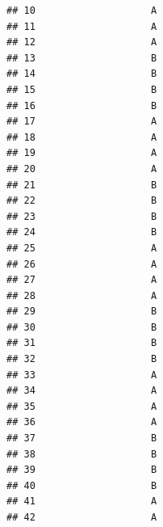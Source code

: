 \documentclass[
]{article}
\begin{document}
\begin{verbatim}
## 10                    A                                                      
## 11                    A                                                      
## 12                    A                                                      
## 13                    B                                                      
## 14                    B                                                      
## 15                    B                                                      
## 16                    B                                                      
## 17                    A                                                      
## 18                    A                                                      
## 19                    A                                                      
## 20                    A                                                      
## 21                    B                                                      
## 22                    B                                                      
## 23                    B                                                      
## 24                    B                                                      
## 25                    A                                                      
## 26                    A                                                      
## 27                    A                                                      
## 28                    A                                                      
## 29                    B                                                      
## 30                    B                                                      
## 31                    B                                                      
## 32                    B                                                      
## 33                    A                                                      
## 34                    A                                                      
## 35                    A                                                      
## 36                    A                                                      
## 37                    B                                                      
## 38                    B                                                      
## 39                    B                                                      
## 40                    B                                                      
## 41                    A                                                      
## 42                    A                                                      

\end{verbatim}
\end{document}
